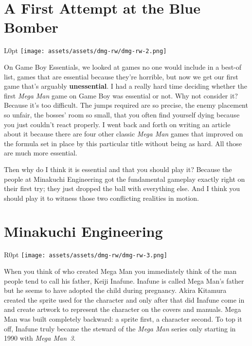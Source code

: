 \documentclass{book}
\begin{document}
\newpage\FloatBarrier\needspace{10mm}\section*{A First Attempt at the Blue Bomber}\nopagebreak[4]
\begin{wrapfigure}{L}{0pt} \texttt{[image: assets/assets/dmg-rw/dmg-rw-2.png]}\end{wrapfigure}
On Game Boy Essentials, we looked at games no one would include in a best-of list, games that are essential because they’re horrible, but now we get our first game that’s arguably \textbf{unessential}. I had a really hard time deciding whether the first \emph{Mega Man} game on Game Boy was essential or not. Why not consider it? Because it’s too difficult. The jumps required are so precise, the enemy placement so unfair, the bosses’ room so small, that you often find yourself dying because you just couldn’t react properly. I went back and forth on writing an article about it because there are four other classic \emph{Mega Man} games that improved on the formula set in place by this particular title without being as hard. All those are much more essential.

Then why do I think it is essential and that you should play it? Because the people at Minakuchi Engineering got the fundamental gameplay exactly right on their first try; they just dropped the ball with everything else. And I think you should play it to witness those two conflicting realities in motion.

\FloatBarrier\needspace{10mm}\section*{Minakuchi Engineering}\nopagebreak[4]

\begin{wrapfigure}{R}{0pt} \texttt{[image: assets/assets/dmg-rw/dmg-rw-3.png]}\end{wrapfigure}
When you think of who created Mega Man you immediately think of the man people tend to call his father, Keiji Inafune. Inafune is called Mega Man’s father but he seems to have adopted the child during pregnancy. Akira Kitamura created the sprite used for the character and only after that did Inafune come in and create artwork to represent the character on the covers and manuals. Mega Man was built completely backward: a sprite first, a character second. To top it off, Inafune truly became the steward of the \emph{Mega Man} series only starting in 1990 with \emph{Mega Man~3}.
\end{document}
